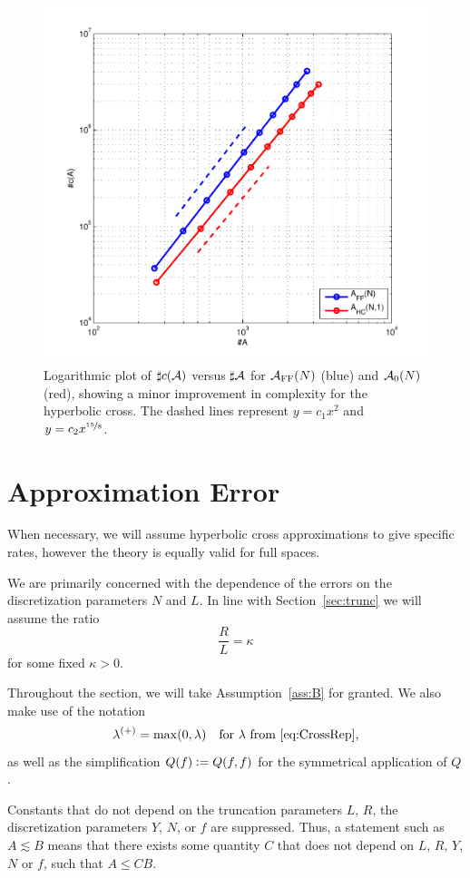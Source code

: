 \begin{figure}
    \centering
    \includegraphics[width=12cm]{figs/hcboltz/complexity}
    \caption{Logarithmic plot of $\sharp c(\mathcal{A})$ versus $\sharp\mathcal{A}$ for $\mathcal{A}_\text{FF}(N)$
        (blue) and $\mathcal{A}_0(N)$ (red), showing a minor improvement in complexity
        for the hyperbolic cross. The dashed lines represent $y=c_1x^2$ and
        $y=c_2x^{\nicefrac{15}{8}}$.}
    \label{fig:complexity}
\end{figure}

\section{Approximation Error} \label{sec:appr}

When necessary, we will assume hyperbolic cross approximations to give specific
rates, however the theory is equally valid for full spaces.

We are primarily concerned with the dependence of the errors on the
discretization parameters $N$ and $L$. In line with Section~\ref{sec:trunc} we
will assume the ratio
$$
    \frac{R}{L} = \kappa
$$
for some fixed $\kappa>0$.

Throughout the section, we will take Assumption~\ref{ass:B} for granted. We
also make use of the notation
$$
    \lambda^{(+)} = \max(0,\lambda) \quad\text{for $\lambda$ from \eqref{eq:CrossRep},}
$$
as well as the simplification $Q(f) \vcentcolon= Q(f,f)$ for the symmetrical application of $Q$.

Constants that do not depend on the truncation parameters $L$, $R$, the
discretization parameters $Y$, $N$, or $f$ are suppressed. Thus, a
statement such as $A\lesssim B$ means that there exists some quantity $C$ that
does not depend on $L$, $R$, $Y$, $N$ or $f$, such that $A \leq CB$.


